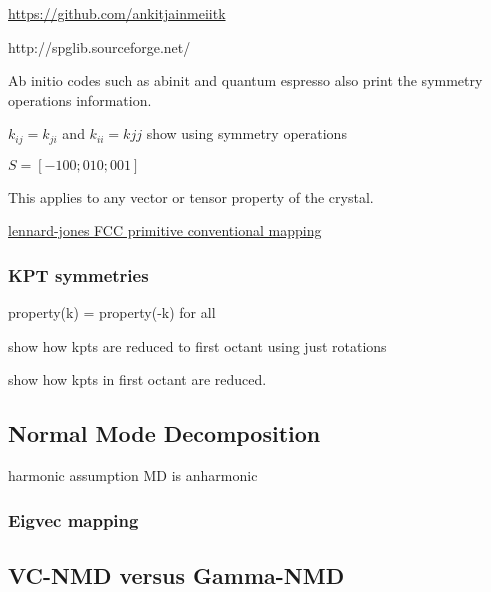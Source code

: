 \href{https://github.com/ankitjainmeiitk}
{https://github.com/ankitjainmeiitk}

http://spglib.sourceforge.net/

Ab initio codes such as abinit and quantum espresso also print the 
symmetry operations information.

$k_{ij} = k_{ji}$  and $k_{ii} = k{jj}$ show using symmetry operations

$S = [-100;010;001 ]$


This applies to any vector or tensor property of the crystal.
      
\cite{sinha_scattering_2005}

\href{https://github.com/jasonlarkin/disorder/blob/master/matlab/lj/phonon/LJ_PRIM_CONV_MAPPING.m}
{lennard-jones FCC primitive conventional mapping}


\subsubsection{KPT symmetries}

property(k) = property(-k)  for all

show how kpts are reduced to first octant using just rotations

show how kpts in first octant are reduced.

\subsection{Normal Mode Decomposition}
harmonic assumption
MD is anharmonic

\subsubsection{Eigvec mapping}

\subsection{VC-NMD versus Gamma-NMD}


